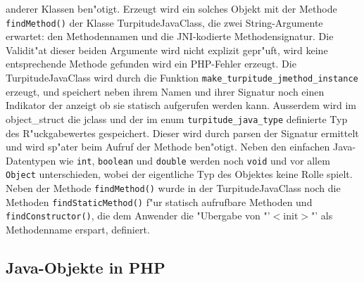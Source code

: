 anderer Klassen ben"otigt. Erzeugt wird ein solches Objekt mit der Methode \texttt{findMethod()} der Klasse TurpitudeJavaClass, die zwei 
String-Argumente erwartet: den Methodennamen und die JNI-kodierte Methodensignatur. Die Validit"at dieser beiden Argumente wird nicht explizit
gepr"uft, wird keine entsprechende Methode gefunden wird ein PHP-Fehler erzeugt. Die TurpitudeJavaClass wird durch die Funktion
\texttt{make\_turpitude\_jmethod\_instance} erzeugt, und speichert neben ihrem Namen und ihrer Signatur noch einen Indikator der anzeigt
ob sie statisch aufgerufen werden kann. Ausserdem wird im object\_struct die jclass und der im enum \texttt{turpitude\_java\_type} definierte
Typ des R"uckgabewertes gespeichert. Dieser wird durch parsen der Signatur ermittelt und wird sp"ater beim Aufruf der Methode ben"otigt.
Neben den einfachen Java-Datentypen wie \texttt{int}, \texttt{boolean} und \texttt{double} werden noch \texttt{void} und vor allem \texttt{Object} unterschieden,
wobei der eigentliche Typ des Objektes keine Rolle spielt.
Neben der Methode \texttt{findMethod()} wurde in der TurpitudeJavaClass noch die Methoden \texttt{findStaticMethod()} f"ur statisch
aufrufbare Methoden und \texttt{findConstructor()}, die dem Anwender die "Ubergabe von "'$<$init$>$"' als Methodenname erspart, definiert.

\subsection{Java-Objekte in PHP}
\label{sec:chap1:impl:5}


